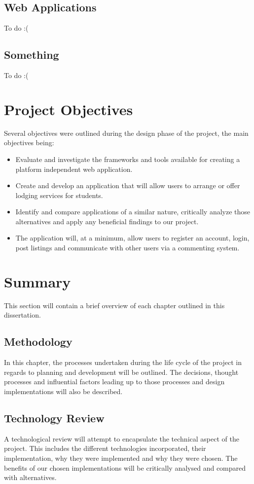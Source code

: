 \subsection{Web Applications}
To do :(
\subsection{Something}
To do :(

\section{Project Objectives}
Several objectives were outlined during the design phase of the project, the main objectives being:

\begin{itemize}
    \item Evaluate and investigate the frameworks and tools available for creating a platform independent web application.
    \item Create and develop an application that will allow users to arrange or offer lodging services for students.
    \item Identify and compare applications of a similar nature, critically analyze those alternatives and apply any beneficial findings to our project.
    \item The application will, at a minimum, allow users to register an account, login, post listings and communicate with other users via a commenting system.
\end{itemize}

\section{Summary}
This section will contain a brief overview of each chapter outlined in this dissertation.
\subsection{Methodology}
In this chapter, the processes undertaken during the life cycle of the project in regards to planning and development will be outlined. The decisions, thought processes and influential factors leading up to those processes and design implementations will also be described.
\subsection{Technology Review}
A technological review will attempt to encapsulate the technical aspect of the project. This includes the different technologies incorporated, their implementation, why they were implemented and why they were chosen. The benefits of our chosen implementations will be critically analysed and compared with alternatives.
